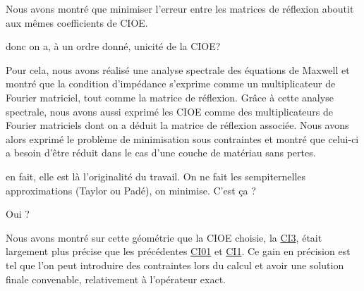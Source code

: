 Nous avons montré que minimiser l'erreur entre les matrices de réflexion aboutit aux mêmes coefficients de CIOE.
\begin{REM}
	donc on a, à un ordre donné, unicité de la CIOE?
\end{REM} 
Pour cela, nous avons réalisé une analyse spectrale des équations de Maxwell et montré que la condition d'impédance s'exprime comme un multiplicateur de Fourier matriciel, tout comme la matrice de réflexion.
Grâce à cette analyse spectrale, nous avons aussi exprimé les CIOE comme des multiplicateurs de Fourier matriciels dont on a déduit la matrice de réflexion associée.
Nous avons alors exprimé le problème de minimisation sous contraintes et montré que celui-ci a besoin d'être réduit dans le cas d'une couche de matériau sans pertes.
\begin{REM}
  en fait, elle est là l’originalité du travail.
  On ne fait les sempiternelles approximations (Taylor ou Padé), on minimise. C'est ça ?
\end{REM}
\begin{REP}
  Oui ?
\end{REP}
Nous avons montré sur cette géométrie que la CIOE choisie, la \hyperlink{ci3}{CI3}, était largement plus précise que les précédentes \hyperlink{ci01}{CI01} et \hyperlink{ci1}{CI1}.
Ce gain en précision est tel que l'on peut introduire des contraintes lors du calcul et avoir une solution finale convenable, relativement à l'opérateur exact.
